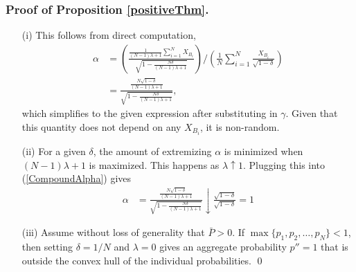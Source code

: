 \documentclass[11pt]{article}
\theoremstyle{definition}
\theoremstyle{definition}
\begin{document}
\subsubsection{Proof of Proposition \ref{positiveThm}.}

\begin{enumerate}
\item[(i)] This follows from direct computation,
\begin{align}
\alpha &= \left( \frac{\frac{1}{(N-1)\lambda +1} 
  \sum_{i=1}^N X_{B_i} }{\sqrt{1- \frac{N\delta}{(N-1)\lambda +1} }} \right) \Big/ \left( \frac{1}{N} \sum_{i=1}^N \frac{X_{B_i}}{\sqrt{1-\delta}} \right) \nonumber \\
&=    \frac{\frac{N\sqrt{1-\delta}}{(N-1)\lambda +1} 
   }{\sqrt{1- \frac{N\delta}{(N-1)\lambda +1} }}, \label{CompoundAlpha}
\end{align}
which simplifies to the given expression after substituting in $\gamma$. Given that this quantity does not depend on any $X_{B_i}$, it is non-random.

\item[(ii)] For a given $\delta$, the amount of extremizing $\alpha$ is minimized when $(N-1)\lambda +1$ is maximized. This happens as $\lambda \uparrow 1$. Plugging this into (\ref{CompoundAlpha}) gives
\begin{align*}
\alpha &= \frac{\frac{N\sqrt{1-\delta}}{(N-1)\lambda +1}}{\sqrt{1- \frac{N\delta}{(N-1)\lambda +1} }}  \downarrow \frac{\sqrt{1-\delta}}{\sqrt{1-\delta }} = 1
\end{align*}
\item[(iii)] Assume without loss of generality that $\bar{P} > 0$. If $\max\{p_1, p_2, \dots, p_N \} < 1$, then  setting $\delta = 1/N$ and $\lambda = 0$ gives an aggregate probability $p'' = 1$ that is outside the convex hull of the individual probabilities.
\qed
\end{enumerate}
\end{document}

